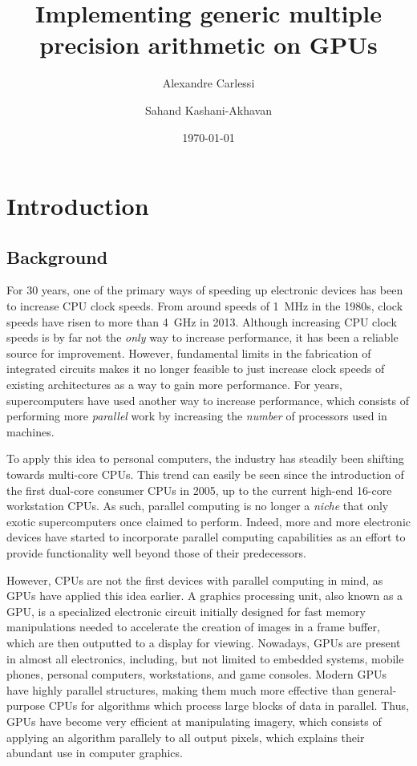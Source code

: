 \documentclass[10pt, a4paper]{report}
\begin{document}
\title{Implementing generic multiple precision arithmetic on GPUs}
\author{Alexandre Carlessi \and Sahand Kashani-Akhavan}
\date{\today}
\maketitle

\tableofcontents

\chapter{Introduction}
\section{Background}
For 30 years, one of the primary ways of speeding up electronic devices has been
to increase CPU clock speeds.
From around speeds of 1~MHz in the 1980s, clock speeds have risen to more than
4~GHz in 2013.
Although increasing CPU clock speeds is by far not the \emph{only} way to
increase performance, it has been a reliable source for improvement.
However, fundamental limits in the fabrication of integrated circuits makes it
no longer feasible to just increase clock speeds of existing architectures as a
way to gain more performance.
For years, supercomputers have used another way to increase performance, which
consists of performing more \emph{parallel} work by increasing the \emph{number}
of processors used in machines.

To apply this idea to personal computers, the industry has steadily been
shifting towards multi-core CPUs.
This trend can easily be seen since the introduction of the first dual-core
consumer CPUs in 2005, up to the current high-end 16-core workstation CPUs.
As such, parallel computing is no longer a \emph{niche} that only exotic
supercomputers once claimed to perform.
Indeed, more and more electronic devices have started to incorporate parallel
computing capabilities as an effort to provide functionality well beyond those
of their predecessors.

However, CPUs are not the first devices with parallel computing in mind, as GPUs
have applied this idea earlier.
A graphics processing unit, also known as a GPU, is a specialized electronic
circuit initially designed for fast memory manipulations needed to accelerate
the creation of images in a frame buffer, which are then outputted to a display
for viewing.
Nowadays, GPUs are present in almost all electronics, including, but not limited
to embedded systems, mobile phones, personal computers, workstations, and game
consoles.
Modern GPUs have highly parallel structures, making them much more effective
than general-purpose CPUs for algorithms which process large blocks of data in
parallel.
Thus, GPUs have become very efficient at manipulating imagery, which consists
of applying an algorithm parallely to all output pixels, which explains their
abundant use in computer graphics.
\end{document}
